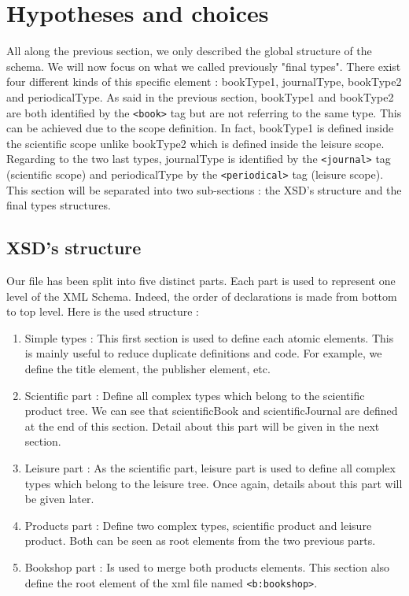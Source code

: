 \documentclass{article}
\begin{document}
\section{Hypotheses and choices}
All along the previous section, we only described the global structure of the schema. We will now focus on what we called previously "final types". There exist four different kinds of this specific element : bookType1, journalType, bookType2 and periodicalType. As said in the previous section, bookType1 and bookType2 are both identified by the \verb|<book>| tag but are not referring to the same type. This can be achieved due to the scope definition. In fact, bookType1 is defined inside the scientific scope unlike bookType2 which is defined inside the leisure scope. Regarding to the two last types, journalType is identified by the \verb|<journal>| tag (scientific scope) and periodicalType by the \verb|<periodical>| tag (leisure scope). This section will be separated into two sub-sections : the XSD's structure and the final types structures.

\subsection{XSD's structure}
Our file has been split into five distinct parts. Each part is used to represent one level of the XML Schema. Indeed, the order of declarations is made from bottom to top level. Here is the used structure :
\begin{enumerate}
\item Simple types : This first section is used to define each atomic elements. This is mainly useful to reduce duplicate definitions and code. For example, we define the title element, the publisher element, etc.
\item Scientific part : Define all complex types which belong to the scientific product tree. We can see that scientificBook and scientificJournal are defined at the end of this section. Detail about this part will be given in the next section.
\item Leisure part : As the scientific part, leisure part is used to define all complex types which belong to the leisure tree. Once again, details about this part will be given later.
\item Products part : Define two complex types, scientific product and leisure product. Both can be seen as root elements from the two previous parts.
\item Bookshop part : Is used to merge both products elements. This section also define the root element of the xml file named \verb|<b:bookshop>|.
\end{enumerate}
\end{document}
